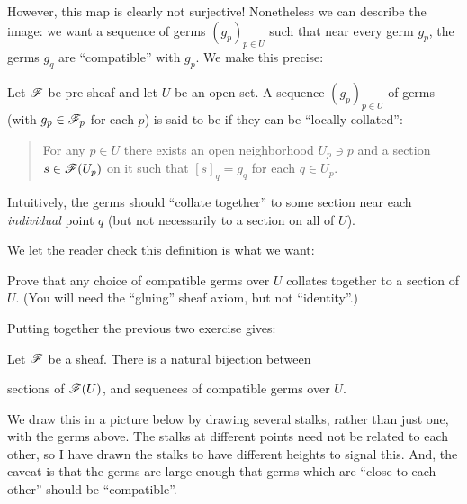 However, this map is clearly not surjective!
Nonetheless we can describe the image:
we want a sequence of germs $(g_p)_{p \in U}$ such that near every germ $g_p$,
the germs $g_q$ are ``compatible'' with $g_p$.
We make this precise:
\begin{definition}
	Let $\mathscr F$ be pre-sheaf and let $U$ be an open set.
	A sequence $(g_p)_{p \in U}$ of germs
	(with $g_p \in \mathscr F_p$ for each $p$)
	is said to be  if
	they can be ``locally collated'':
	\begin{quote}
		For any $p \in U$ there exists an open neighborhood $U_p \ni p$
		and a section $s \in \mathscr F(U_p)$ on it
		such that $[s]_q = g_q$ for each $q \in U_p$.
	\end{quote}
	Intuitively, the germs should ``collate together'' to some section near
	each \emph{individual} point $q$
	(but not necessarily to a section on all of $U$).
\end{definition}

We let the reader check this definition is what we want:
\begin{exercise}
	Prove that any choice of compatible germs over $U$
	collates together to a section of $U$.
	(You will need the ``gluing'' sheaf axiom, but not ``identity''.)
\end{exercise}

Putting together the previous two exercise gives:
\begin{theorem}
	Let $\mathscr F$ be a sheaf.
	There is a natural bijection between
	\begin{itemize}
		\ii sections of $\mathscr F(U)$, and
		\ii sequences of compatible germs over $U$.
	\end{itemize}
\end{theorem}


We draw this in a picture below
by drawing several stalks, rather than just one,
with the germs above.
The stalks at different points need not be related to each other,
so I have drawn the stalks to have different heights to signal this.
And, the caveat is that the germs are large enough that germs
which are ``close to each other'' should be ``compatible''.


